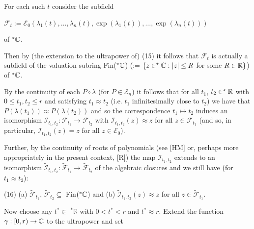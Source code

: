 \documentclass[12pt,nodate]{article}
\begin{document}
 For each such $t$ consider the subfield
 
 \vspace{2mm}
 
 \hspace {4mm} $\mathcal{F}_t  := \mathcal{E}_0 ( \lambda_1 (t) , \ldots , \lambda_n (t), \exp (\lambda_1 (t)) , \ldots , \exp(\lambda_n (t)))$
 
 \vspace{2mm} 
 
 \noindent
 of $^{\star} \mathbb{C}$.
 
 \vspace{2mm}
 
 Then by (the extension to the ultrapower of) (15) it follows that $\mathcal{F}_t$ is actually a subfield of the valuation subring Fin($^{\star}\mathbb{C}$) (:= $\{ z \in ^{\star}\mathbb{C} : |z| \leq R$ for some $R \in \mathbb{R} \}$) of $^{\star}\mathbb{C}$.

 By the continuity of each $P \circ \lambda$ (for $P \in \mathcal{E}_n$) it follows that for all $t_1$, $t_2 \in ^{\star}\mathbb{R}$ with $0 \leq t_1 , t_2 \leq r$ and satisfying $t_1 \approx t_2$ (i.e. $t_1$ infinitesimally close to $t_2$) we have that $P( \lambda (t_1 )) \approx P(\lambda (t_2 ))$ and so the correspondence $t_1 \mapsto t_2$ induces an isomorphism $\mathcal{I}_{t_1 ,t_2} : \mathcal{F}_{t_1} \rightarrow \mathcal{F}_{t_2}$ with $\mathcal{I}_{t_1 ,t_2} (z) \approx z$ for all $z \in \mathcal{F}_{t_1}$ (and so, in particular, $\mathcal{I}_{t_1 ,t_2} (z) = z$ for all $z \in \mathcal{E}_0$).

 Further, by the continuity of roots of polynomials (see [HM] or, perhaps more appropriately in the present context, [R]) the map 
 $\mathcal{I}_{t_1 ,t_2}$ extends to an isomorphism $\widetilde{\mathcal{I}}_{t_1 ,t_2} : \widetilde{\mathcal{F}}_{t_1} \rightarrow \widetilde{\mathcal{F}}_{t_2}$ of the algebraic closures and we still have (for $t_1 \approx t_2$):
 
 \vspace{2mm}
 
 \noindent
 (16) \hspace{2mm} (a) $\widetilde{\mathcal{F}}_{t_1}$, $\widetilde{\mathcal{F}}_{t_2} \subseteq$ Fin$(^* \mathbb{C}$) and (b) $\widetilde{\mathcal{I}}_{t_1 ,t_2} (z) \approx z$ for all $z \in \widetilde{\mathcal{F}}_{t_1}$.
 
 \vspace{2mm}
 
 Now choose any $t^* \in$ $^*\mathbb{R}$ with $0 < t^* < r$ and $t^* \approx r$. Extend the function $\gamma : [0, r) \rightarrow \mathbb{C}$ to the ultrapower and set
  
\end{document}
